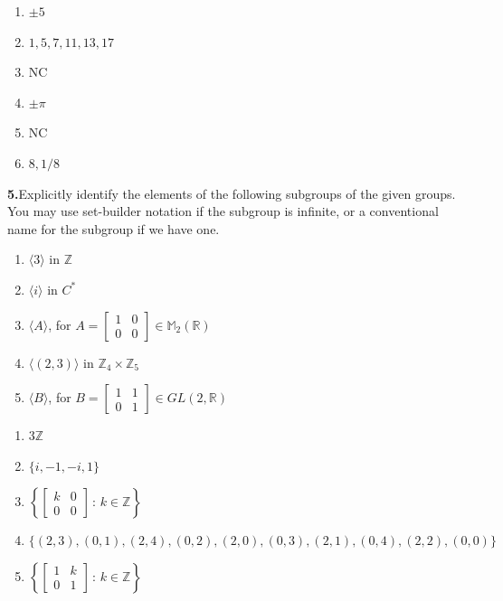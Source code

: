 \documentclass[10pt,]{book}
\theoremstyle{plain}
\theoremstyle{definition}
\theoremstyle{definition}
\theoremstyle{definition}
\theoremstyle{definition}
\numberwithin{equation}{section}
\def\Z{\mathbb{Z}}
\def\R{\mathbb{R}}
\def\M{\mathbb{M}}
\newcommand{\amp}{&}
\begin{document}
%
\par\smallskip
\leavevmode%
\begin{enumerate}[label=(\alph*)]
\item\hypertarget{li-302}{}\(\pm 5\)%
\item\hypertarget{li-303}{}\(1,5,7,11,13,17\)%
\item\hypertarget{li-304}{}NC%
\item\hypertarget{li-305}{}\(\pm \pi\)%
\item\hypertarget{li-306}{}NC%
\item\hypertarget{li-307}{}\(8,1/8\)%
\end{enumerate}
\par\smallskip
\noindent\textbf{5.}\quad{}Explicitly identify the elements of the following subgroups of the given groups. You may use set-builder notation if the subgroup is infinite, or a conventional name for the subgroup if we have one. \leavevmode%
\begin{enumerate}[label=(\alph*)]
\item\hypertarget{li-308}{}\(\langle 3\rangle\) in \(\Z\)%
\item\hypertarget{li-309}{}\(\langle i\rangle\) in \(C^*\)%
\item\hypertarget{li-310}{}\(\langle A\rangle\), for \(A=\left[ \begin{array}{cc}
1 \amp  0 \\
0 \amp  0
\end{array} 
\right]\in \M_2(\R)\)%
\item\hypertarget{li-311}{}\(\langle (2,3)\rangle\) in \(\Z_4\times \Z_5\)%
\item\hypertarget{li-312}{}\(\langle B\rangle\), for \(B=\left[ \begin{array}{cc}
1 \amp  1\\
0 \amp  1
\end{array} 
\right]\in GL(2,\R)\)%
\end{enumerate}
%
\par\smallskip
\leavevmode%
\begin{enumerate}[label=(\alph*)]
\item\hypertarget{li-313}{}\(3\Z\)%
\item\hypertarget{li-314}{}\(\{i,-1,-i,1\}\)%
\item\hypertarget{li-315}{}\(\left\{\left[
\begin{array}{cc}
k \amp  0 \\
0 \amp  0
\end{array} 
\right]\,:\,k\in \Z
\right\}\)%
\item\hypertarget{li-316}{}\(\{(2,3),(0,1),(2,4),(0,2),(2,0),(0,3),(2,1),(0,4),(2,2),(0,0)\}\)%
\item\hypertarget{li-317}{}\(\left\{\left[
\begin{array}{cc}
1 \amp  k \\
0 \amp  1
\end{array} 
\right]\,:\,k\in \Z\right\}\)%
\end{enumerate}
\end{document}
